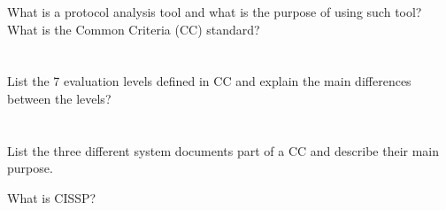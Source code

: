 \begin{questions}
\question{} What is a protocol analysis tool and what is the purpose of using such tool?
\question{} What is the Common Criteria (CC) standard?
  \begin{parts}
  \part{} List the 7 evaluation levels defined in CC and explain the main differences between the levels?
  \part{} List the three different system documents part of a CC and describe their main purpose.
  \end{parts}

\question{} What is CISSP?\@
\end{questions}

